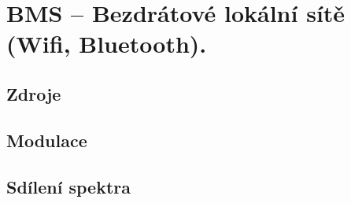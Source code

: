 

\graphicspath{{bms/bezdratove_lokalni_site/figures}}


\chapter{BMS -- Bezdrátové lokální sítě (Wifi, Bluetooth).}



\section{Zdroje}

\begin{compactitem}
    \item {}
    \item {} %
    \item {}
\end{compactitem}


\section{Modulace}



\section{Sdílení spektra}

